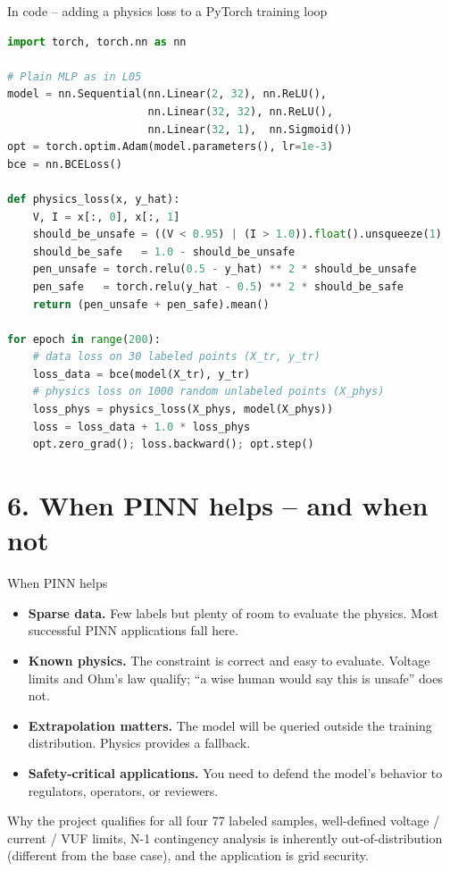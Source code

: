 \documentclass[aspectratio=169,10pt]{beamer}
\begin{document}
\begin{frame}[fragile]{In code -- adding a physics loss to a PyTorch training loop}
\begin{lstlisting}[language=Python]
import torch, torch.nn as nn

# Plain MLP as in L05
model = nn.Sequential(nn.Linear(2, 32), nn.ReLU(),
                      nn.Linear(32, 32), nn.ReLU(),
                      nn.Linear(32, 1),  nn.Sigmoid())
opt = torch.optim.Adam(model.parameters(), lr=1e-3)
bce = nn.BCELoss()

def physics_loss(x, y_hat):
    V, I = x[:, 0], x[:, 1]
    should_be_unsafe = ((V < 0.95) | (I > 1.0)).float().unsqueeze(1)
    should_be_safe   = 1.0 - should_be_unsafe
    pen_unsafe = torch.relu(0.5 - y_hat) ** 2 * should_be_unsafe
    pen_safe   = torch.relu(y_hat - 0.5) ** 2 * should_be_safe
    return (pen_unsafe + pen_safe).mean()

for epoch in range(200):
    # data loss on 30 labeled points (X_tr, y_tr)
    loss_data = bce(model(X_tr), y_tr)
    # physics loss on 1000 random unlabeled points (X_phys)
    loss_phys = physics_loss(X_phys, model(X_phys))
    loss = loss_data + 1.0 * loss_phys
    opt.zero_grad(); loss.backward(); opt.step()
\end{lstlisting}
\end{frame}

\section*{6. When PINN helps -- and when not}

\begin{frame}{When PINN helps}
\begin{itemize}
  \item \textbf{Sparse data.} Few labels but plenty of room to evaluate the physics. Most successful PINN applications fall here.
  \item \textbf{Known physics.} The constraint is correct and easy to evaluate. Voltage limits and Ohm's law qualify; ``a wise human would say this is unsafe'' does not.
  \item \textbf{Extrapolation matters.} The model will be queried outside the training distribution. Physics provides a fallback.
  \item \textbf{Safety-critical applications.} You need to defend the model's behavior to regulators, operators, or reviewers.
\end{itemize}
\vspace{0.5em}
\begin{block}{Why the project qualifies for all four}
77 labeled samples, well-defined voltage / current / VUF limits, N-1 contingency analysis is inherently out-of-distribution (different from the base case), and the application is grid security.
\end{block}
\end{frame}
\end{document}
